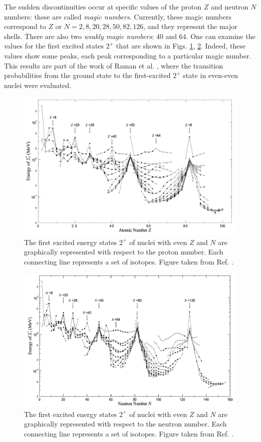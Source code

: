 The sudden discontinuities occur at specific values of the proton $Z$ and neutron $N$ numbers: these are called \emph{magic numbers}. Currently, these magic numbers correspond to $Z$ or $N=2,8,20,28,50,82,126$, and they represent the major shells. There are also two \emph{weakly magic numbers}: 40 and 64. One can examine the values for the first excited states $2^+$ that are shown in Figs. \ref{e2plus_proton}, \ref{e2plus_neutron}. Indeed, these values show some peaks, each peak corresponding to a particular magic number. This results are part of the work of Raman et al. \cite{raman2001transition}, where the transition probabilities from the ground state to the first-excited $2^+$ state in even-even nuclei were evaluated.
\begin{figure}
    \centering
    \includegraphics[width=0.99\textwidth]{Chapters/Figures/E2plus_proton.pdf}
    \caption{The first excited energy states $2^+$ of nuclei with even $Z$ and $N$ are graphically represented with respect to the proton number. Each connecting line represents a set of isotopes. Figure taken from Ref. \cite{matta2017exotic}.}
    \label{e2plus_proton}
\end{figure}
\begin{figure}
    \centering
    \includegraphics[width=0.99\textwidth]{Chapters/Figures/E2plus_neutron.pdf}
    \caption{The first excited energy states $2^+$ of nuclei with even $Z$ and $N$ are graphically represented with respect to the neutron number. Each connecting line represents a set of isotopes. Figure taken from Ref. \cite{matta2017exotic}.}
    \label{e2plus_neutron}
\end{figure}

